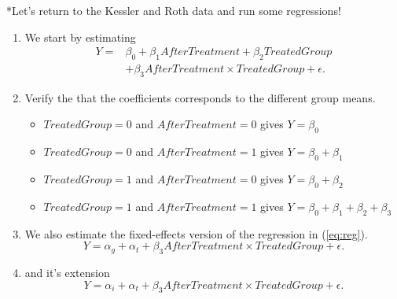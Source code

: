 \documentclass[notes,11pt, aspectratio=169]{beamer}
\begin{document}
\begin{frame}{*Let's return to the Kessler and Roth data and run some regressions!}
\begin{enumerate}
\item We start by estimating 
\begin{align}\label{eq:reg}
Y = &\beta_0 + \beta_1 AfterTreatment + \beta_2 TreatedGroup\\ \nonumber 
&+ \beta_3 AfterTreatment \times TreatedGroup + \epsilon.  
\end{align}
\item Verify the that the coefficients corresponds to the different group means. 
 \begin{itemize}
    \item $TreatedGroup=0$ and $AfterTreatment=0$ gives $Y=\beta_0$ 
    \item $TreatedGroup=0$ and $AfterTreatment=1$ gives $Y=\beta_0 + \beta_1$ 
    \item $TreatedGroup=1$ and $AfterTreatment=0$ gives $Y=\beta_0 + \beta_2$ 
    \item $TreatedGroup=1$ and $AfterTreatment=1$ gives $Y=\beta_0+\beta_1+\beta_2+\beta_3$ 
    \end{itemize}
\item We also estimate the fixed-effects version of the regression in (\ref{eq:reg}).
\begin{equation}
Y = \alpha_g + \alpha_{t} + \beta_3 AfterTreatment \times TreatedGroup + \epsilon.
\end{equation}
\item and it's extension
\begin{equation}
Y = \alpha_i + \alpha_{t} + \beta_3 AfterTreatment \times TreatedGroup + \epsilon.
\end{equation}
\end{enumerate}
\end{frame}
\end{document}
